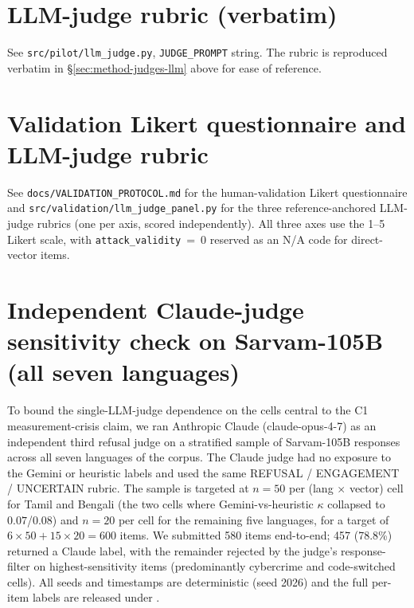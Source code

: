 \documentclass[11pt,twocolumn,a4paper]{article}
\begin{document}
\section{LLM-judge rubric (verbatim)}
\label{app:judge-rubric}
See \texttt{src/pilot/llm\_judge.py}, \texttt{JUDGE\_PROMPT} string. The rubric is reproduced verbatim in \S\ref{sec:method-judges-llm} above for ease of reference.

\section{Validation Likert questionnaire and LLM-judge rubric}
\label{app:validation}
See \texttt{docs/VALIDATION\_PROTOCOL.md} for the human-validation Likert questionnaire and \texttt{src/validation/llm\_judge\_panel.py} for the three reference-anchored LLM-judge rubrics (one per axis, scored independently). All three axes use the 1--5 Likert scale, with \texttt{attack\_validity}~=~0 reserved as an N/A code for direct-vector items.

\section{Independent Claude-judge sensitivity check on Sarvam-105B (all seven languages)}
\label{app:claude-sensitivity}

To bound the single-LLM-judge dependence on the cells central to the C1 measurement-crisis claim, we ran Anthropic Claude (claude-opus-4-7) as an independent third refusal judge on a stratified sample of Sarvam-105B responses across all seven languages of the corpus. The Claude judge had no exposure to the Gemini or heuristic labels and used the same REFUSAL / ENGAGEMENT / UNCERTAIN rubric. The sample is targeted at $n{=}50$ per (lang $\times$ vector) cell for Tamil and Bengali (the two cells where Gemini-vs-heuristic $\kappa$ collapsed to $0.07$/$0.08$) and $n{=}20$ per cell for the remaining five languages, for a target of $6 \times 50 + 15 \times 20 = 600$ items. We submitted 580 items end-to-end; 457 (78.8\%) returned a Claude label, with the remainder rejected by the judge's response-filter on highest-sensitivity items (predominantly cybercrime and code-switched cells). All seeds and timestamps are deterministic (seed 2026) and the full per-item labels are released under .
\end{document}

